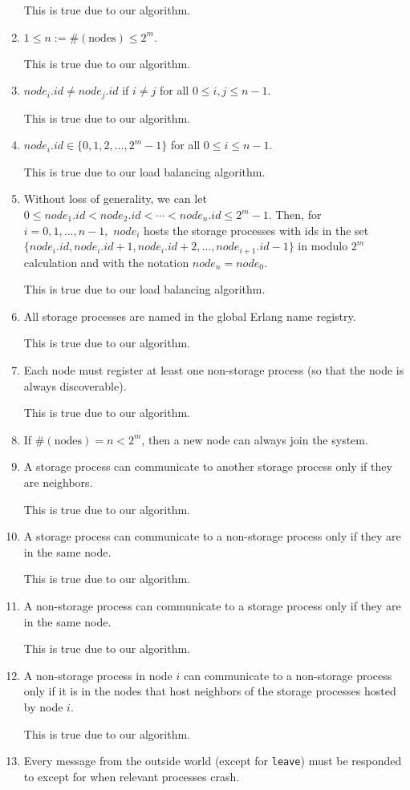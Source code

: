 \documentclass[11pt]{article}
\begin{document}
\begin{enumerate}[S1]
This is true due to our algorithm.
\item $1 \leq n:= \#(\text{nodes}) \leq 2^m.$

This is true due to our algorithm.
\item $node_i.id \neq node_j.id$ if $i\neq j$ for all $0\leq i,j \leq n - 1.$ 

This is true due to our algorithm.
\item $node_i.id \in \{0,1,2,\ldots, 2^m - 1\}$ for all $0\leq i \leq n - 1.$ 

This is true due to our load balancing algorithm.
\item Without loss of generality, we can let
$0 \leq node_1.id < node_2.id < \cdots < node_n.id \leq 2^m - 1.$
Then, for $i= 0, 1, \ldots, n - 1,$ $node_i$ hosts the storage processes with ids in the set $\{node_i.id, node_i.id + 1, node_i.id + 2, \ldots, node_{i+1}.id - 1\}$ in modulo $2^m$ calculation and with the notation $node_{n} = node_0.$

This is true due to our load balancing algorithm.
\item All storage processes are named in the global Erlang name registry.

This is true due to our algorithm.
\item Each node must register at least one non-storage process (so that the node is always discoverable).

This is true due to our algorithm.
\item If $\#(\text{nodes}) = n < 2^m$, then a new node can always join the system.

\item A storage process can communicate to another storage process only if they are neighbors.

This is true due to our algorithm.
\item  A storage process can communicate to a non-storage process only if they are in the same node.

This is true due to our algorithm.
\item A non-storage process can communicate to a storage process only if they are in the same node.

This is true due to our algorithm.
\item  A non-storage process in node $i$ can communicate to a non-storage process only if it is in the nodes that host neighbors of the storage processes hosted by node $i$.

This is true due to our algorithm.
\item Every message from the outside world (except for \texttt{leave}) must be responded to except for when relevant processes crash.


\end{enumerate}
\end{document}
